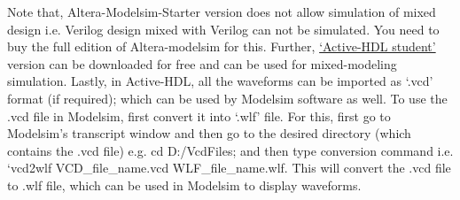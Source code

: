 Note that, Altera-Modelsim-Starter version does not allow simulation of mixed design i.e. Verilog design mixed with Verilog can not be simulated. You need to buy the full edition of Altera-modelsim for this. Further, \href{https://www.aldec.com/en/products/fpga_simulation/active_hdl_student}{`Active-HDL student'} version can be downloaded for free and can be used for mixed-modeling simulation. Lastly, in Active-HDL, all the waveforms can be imported as `.vcd' format (if required); which can be used by Modelsim software as well. To use the .vcd file in Modelsim, first convert it into `.wlf' file. For this, first go to Modelsim's transcript window and then go to the desired directory (which contains the .vcd file) e.g. cd D:/VcdFiles; and then type conversion command i.e. `vcd2wlf VCD\_file\_name.vcd WLF\_file\_name.wlf. This will convert the .vcd file to .wlf file, which can be used in Modelsim to display waveforms.

